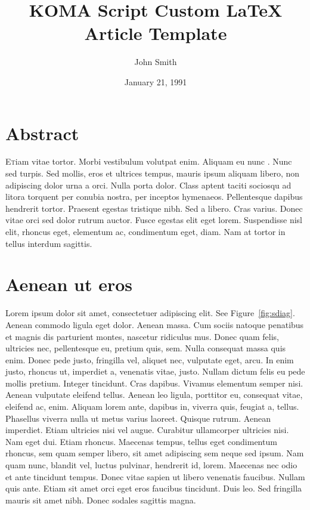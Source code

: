 \documentclass[a4paper,11pt]{scrartcl}
\title{KOMA Script Custom LaTeX Article Template}
\author{John Smith}
\date{January 21, 1991}
\begin{document}
\maketitle

\section*{Abstract}
 \lettrine[nindent=0em,lines=3]{E} tiam vitae tortor. Morbi vestibulum volutpat enim. Aliquam eu nunc \cite{lamport1986latex}. Nunc sed turpis. Sed mollis, eros et ultrices tempus, mauris ipsum aliquam libero, non adipiscing dolor urna a orci. Nulla porta dolor. Class aptent taciti sociosqu ad litora torquent per conubia nostra, per inceptos hymenaeos. Pellentesque dapibus hendrerit tortor. Praesent egestas tristique nibh. Sed a libero. Cras varius. Donec vitae orci sed dolor rutrum auctor. Fusce egestas elit eget lorem. Suspendisse nisl elit, rhoncus eget, elementum ac, condimentum eget, diam. Nam at tortor in tellus interdum sagittis.

\section{Aenean ut eros}
 Lorem ipsum dolor sit amet, consectetuer adipiscing elit. See Figure~\ref{fig:sdiag}. Aenean commodo ligula eget dolor. Aenean massa. Cum sociis natoque penatibus et magnis dis parturient montes, nascetur ridiculus mus. Donec quam felis, ultricies nec, pellentesque eu, pretium quis, sem. Nulla consequat massa quis enim. Donec pede justo, fringilla vel, aliquet nec, vulputate eget, arcu. In enim justo, rhoncus ut, imperdiet a, venenatis vitae, justo. Nullam dictum felis eu pede mollis pretium. Integer tincidunt. Cras dapibus. Vivamus elementum semper nisi. Aenean vulputate eleifend tellus. Aenean leo ligula, porttitor eu, consequat vitae, eleifend ac, enim. Aliquam lorem ante, dapibus in, viverra quis, feugiat a, tellus. Phasellus viverra nulla ut metus varius laoreet. Quisque rutrum. Aenean imperdiet. Etiam ultricies nisi vel augue. Curabitur ullamcorper ultricies nisi. Nam eget dui. Etiam rhoncus. Maecenas tempus, tellus eget condimentum rhoncus, sem quam semper libero, sit amet adipiscing sem neque sed ipsum. Nam quam nunc, blandit vel, luctus pulvinar, hendrerit id, lorem. Maecenas nec odio et ante tincidunt tempus. Donec vitae sapien ut libero venenatis faucibus. Nullam quis ante. Etiam sit amet orci eget eros faucibus tincidunt. Duis leo. Sed fringilla mauris sit amet nibh. Donec sodales sagittis magna.
\end{document}
